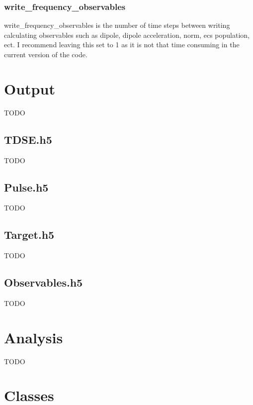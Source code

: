 \documentclass{article}
\begin{document}
\subsubsection{write\_frequency\_observables}
write\_frequency\_observables is the number of time steps between writing calculating observables such as dipole, dipole acceleration, norm, ecs population, ect. I recommend leaving this set to 1 as it is not that time consuming in the current version of the code.


\section{Output} %
\label{sec:output}
TODO

\subsection{TDSE.h5} %
\label{sub:tdse_h5}
TODO

\subsection{Pulse.h5} %
\label{sub:pulse_h5}
TODO

\subsection{Target.h5} %
\label{sub:target_h5}
TODO

\subsection{Observables.h5} %
\label{sub:observables_h5}
TODO


\section{Analysis} %
\label{sec:analysis}
TODO



\section{Classes} %
\label{sec:classes}
\end{document}
